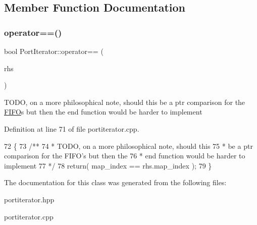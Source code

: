 \subsection{Member Function Documentation}
\hypertarget{class_port_iterator_ad41e4cf00699a49d6e0a30c8af3e7469}{}\label{class_port_iterator_ad41e4cf00699a49d6e0a30c8af3e7469} 
\subsubsection{\texorpdfstring{operator==()}{operator==()}}
{\footnotesize\ttfamily bool Port\+Iterator\+::operator== (\begin{DoxyParamCaption}\item[{const \hyperlink{class_port_iterator}{Port\+Iterator} \&}]{rhs }\end{DoxyParamCaption})}

T\+O\+DO, on a more philosophical note, should this be a ptr comparison for the \hyperlink{class_f_i_f_o}{F\+I\+FO}\textquotesingle{}s but then the end function would be harder to implement

Definition at line 71 of file portiterator.\+cpp.


\begin{DoxyCode}
72 \{\textcolor{comment}{}
73 \textcolor{comment}{   /** }
74 \textcolor{comment}{    * TODO, on a more philosophical note, should this}
75 \textcolor{comment}{    * be a ptr comparison for the FIFO's but then the }
76 \textcolor{comment}{    * end function would be harder to implement}
77 \textcolor{comment}{    */}
78    \textcolor{keywordflow}{return}( map\_index == rhs.map\_index );
79 \}
\end{DoxyCode}


The documentation for this class was generated from the following files\+:\begin{DoxyCompactItemize}
\item 
portiterator.\+hpp\item 
portiterator.\+cpp\end{DoxyCompactItemize}
